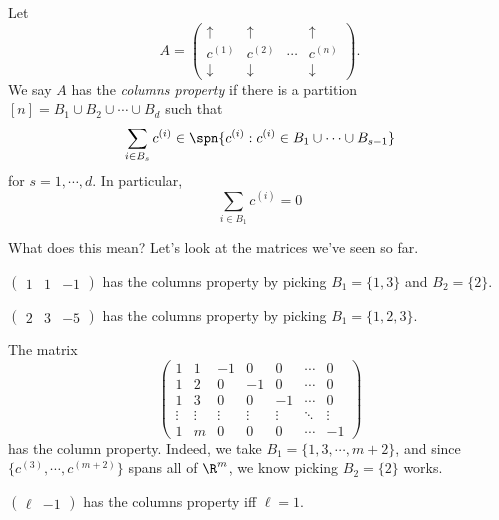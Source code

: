 \documentclass[a4paper]{article}
\begin{document}
\begin{defi}
  Let
  \[
    A =
    \begin{pmatrix}
      \uparrow & \uparrow & & \uparrow\\
      c^{(1)} & c^{(2)} & \cdots & c^{(n)}\\
      \downarrow & \downarrow & & \downarrow
    \end{pmatrix}.
  \]
  We say $A$ has the \emph{columns property} if there is a partition $[n] = B_1 \cup B_2 \cup \cdots \cup B_d$ such that
  \[
    \sum_{i \in B_s} c^{(i)} \in \spn\{c^{(i)} : c^{(i)} \in B_1 \cup \cdots \cup B_{s - 1}\}
  \]
  for $s = 1, \cdots, d$. In particular,
  \[
    \sum_{i \in B_1} c^{(i)} = 0
  \]
\end{defi}
What does this mean? Let's look at the matrices we've seen so far.
\begin{eg}
  $\begin{pmatrix}1 & 1 & -1\end{pmatrix}$ has the columns property by picking $B_1 = \{1, 3\}$ and $B_2 = \{2\}$.
\end{eg}

\begin{eg}
  $\begin{pmatrix}2 & 3 & -5\end{pmatrix}$ has the columns property by picking $B_1 = \{1, 2, 3\}$.
\end{eg}

\begin{eg}
  The matrix
  \[
    \begin{pmatrix}
      1 & 1 & -1 & 0 & 0 & \cdots & 0\\
      1 & 2 & 0 & -1 & 0 & \cdots & 0\\
      1 & 3 & 0 & 0 & -1 & \cdots & 0\\
      \vdots & \vdots & \vdots & \vdots & \vdots & \ddots & \vdots\\
      1 & m & 0 & 0 & 0 & \cdots & -1
    \end{pmatrix}
  \]
  has the column property. Indeed, we take $B_1 = \{1, 3, \cdots, m + 2\}$, and since $\{c^{(3)}, \cdots, c^{(m + 2)}\}$ spans all of $\R^m$, we know picking $B_2 = \{2\}$ works.
\end{eg}

\begin{eg}
  $\begin{pmatrix}\ell & -1\end{pmatrix}$ has the columns property iff $\ell = 1$.
\end{eg}
\end{document}
